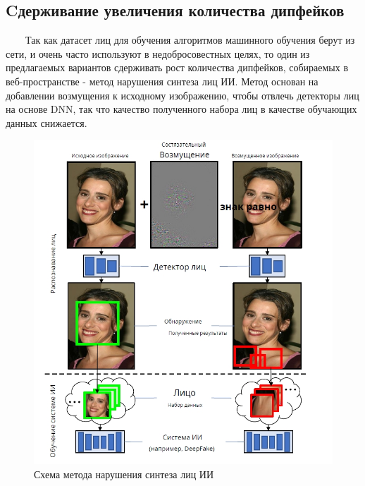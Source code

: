 \documentclass[12pt]{article}
\begin{document}
    \subsection{Cдерживание увеличения количества дипфейков}
        $\qquad$Так как датасет лиц для обучения алгоритмов машинного обучения берут из сети, и очень часто используют в недобросовестных целях, то один из предлагаемых вариантов сдерживать рост количества дипфейков, собираемых в веб-пространстве - метод нарушения синтеза лиц ИИ. Метод основан на добавлении возмущения к исходному изображению, чтобы отвлечь детекторы лиц на основе DNN, так что качество полученного набора лиц в качестве обучающих данных снижается. 
         \begin{figure}[h!]
            \centering
            \includegraphics[width = 300 pt] {17.jpg}
            \caption{Схема метода нарушения синтеза лиц ИИ}
        \end{figure}
\end{document}
